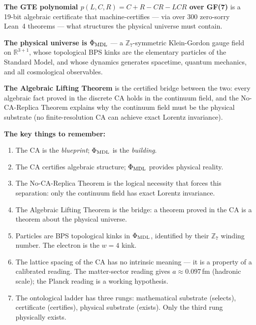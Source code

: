 \documentclass[11pt,a4paper]{article}
\newcommand{\PhiMDL}{\Phi_{\rm MDL}}
\newcommand{\ZS}{\mathbb{Z}_7}
\theoremstyle{definition}
\begin{document}
\begin{tcolorbox}[colback=boxblue,colframe=blue!40!black,
  title=The three-sentence summary]
\textbf{The GTE polynomial $p(L,C,R) = C + R - CR - LCR$ over GF(7)} is a 19-bit
algebraic certificate that machine-certifies --- via over 300 zero-sorry Lean~4
theorems --- what structures the physical universe must contain.

\medskip\noindent
\textbf{The physical universe is $\PhiMDL$} --- a $\ZS$-symmetric Klein-Gordon
gauge field on $\mathbb{R}^{3+1}$, whose topological BPS kinks are the elementary
particles of the Standard Model, and whose dynamics generates spacetime, quantum
mechanics, and all cosmological observables.

\medskip\noindent
\textbf{The Algebraic Lifting Theorem} is the certified bridge between the two:
every algebraic fact proved in the discrete CA holds in the continuum field,
and the No-CA-Replica Theorem explains why the continuum field must be
the physical substrate (no finite-resolution CA can achieve exact Lorentz invariance).
\end{tcolorbox}

\bigskip
\noindent
\textbf{The key things to remember:}

\begin{enumerate}[itemsep=8pt]
  \item The CA is the \emph{blueprint}; $\PhiMDL$ is the \emph{building}.

  \item The CA certifies algebraic structure; $\PhiMDL$ provides physical reality.

  \item The No-CA-Replica Theorem is the logical necessity that forces this
    separation: only the continuum field has exact Lorentz invariance.

  \item The Algebraic Lifting Theorem is the bridge: a theorem proved in the CA
    is a theorem about the physical universe.

  \item Particles are BPS topological kinks in $\PhiMDL$, identified by their
    $\ZS$ winding number.  The electron is the $w=4$ kink.

  \item The lattice spacing of the CA has no intrinsic meaning --- it is a
    property of a calibrated reading.  The matter-sector reading gives
    $a \approx 0.097$\,fm (hadronic scale); the Planck reading is a
    working hypothesis.

  \item The ontological ladder has three rungs: mathematical substrate (selects),
    certificate (certifies), physical substrate (exists).  Only the third rung
    physically exists.
\end{enumerate}
\end{document}

